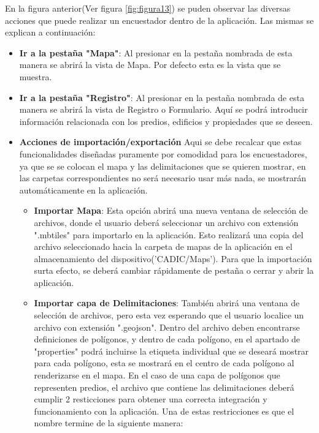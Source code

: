 En la figura anterior(Ver figura \ref{fig:figura13}) se puden observar las diversas acciones que puede realizar un encuestador dentro de
la aplicación. Las mismas se explican a continuación:
\begin{itemize}
    \item \textbf{Ir a la pestaña "Mapa"}: Al presionar en la pestaña nombrada de esta manera se abrirá la vista de Mapa. Por defecto esta es la vista que se muestra.
    \item \textbf{Ir a la pestaña "Registro"}: Al presionar en la pestaña nombrada de esta manera se abrirá la vista de Registro o Formulario. Aquí se podrá introducir información relacionada con los predios, edificios y propiedades que se deseen.
    \item \textbf{Acciones de importación/exportación}
          Aqui se debe recalcar que estas funcionalidades diseñadas puramente por comodidad para los encuestadores, ya que se se colocan el mapa y las
          delimitaciones que se quieren mostrar, en las carpetas correspondientes no será necesario usar más nada, se mostrarán automáticamente en la aplicación.
          \begin{itemize}
              \item \textbf{Importar Mapa}: Esta opción abrirá una nueva ventana de selección de archivos, donde el usuario deberá seleccionar
                    un archivo con extensión ".mbtiles" para importarlo en la aplicación. Esto realizará una copia del archivo seleccionado hacia
                    la carpeta de mapas de la aplicación en el almacenamiento del dispositivo('CADIC/Maps'). Para que la importación surta efecto,
                    se deberá cambiar rápidamente de pestaña o cerrar y abrir la aplicación.
              \item \textbf{Importar capa de Delimitaciones}: También abrirá una ventana de selección de archivos, pero esta vez esperando que
                    el usuario localice un archivo con extensión ".geojson". Dentro del archivo deben encontrarse definiciones de polígonos, y
                    dentro de cada polígono, en el apartado de "properties" podrá incluirse la etiqueta individual que se deseará mostrar para
                    cada polígono, esta se mostrará en el centro de cada polígono al renderizarse en el mapa. En el caso de una capa de polígonos
                    que representen predios, el archivo que contiene las delimitaciones deberá cumplir 2 resticciones para obtener
                    una correcta integración y funcionamiento con la aplicación. Una de estas restricciones es que el nombre termine de la siguiente manera:

\end{itemize}
\end{itemize}
